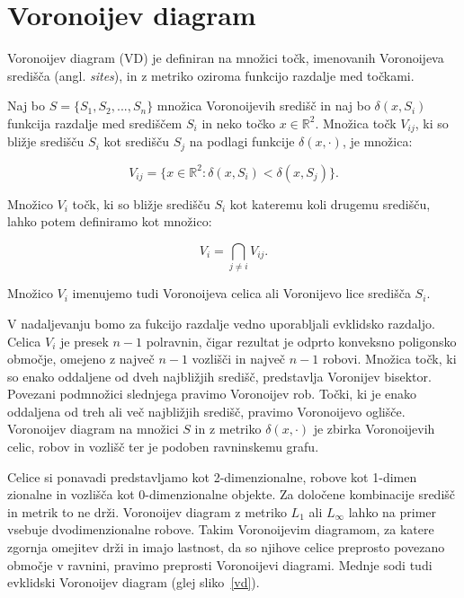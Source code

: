 \documentclass[a4paper, 12pt]{book}
\begin{document}
\section{Voronoijev diagram}
Voronoijev diagram (VD) je definiran na množici točk, imenovanih Voronoijeva središča (angl. \textit{sites}), in z metriko oziroma funkcijo razdalje med točkami.

Naj bo $S = \{S_1,S_2,...,S_n\}$ množica Voronoijevih središč in naj bo $\delta(x,S_i)$ funkcija razdalje med središčem $S_i$ in neko točko $x \in \mathbb{R}^2$. Množica točk $V_{ij}$, ki so bližje središču $S_i$ kot središču $S_j$ na podlagi funkcije $\delta(x,\cdot)$, je množica:

\begin{equation*}
V_{ij} = \{x \in \mathbb{R}^2: \delta(x,S_i) < \delta(x,S_j)\}. 
\end{equation*}

Množico $V_i$ točk, ki so bližje središču $S_i$ kot kateremu koli drugemu središču, lahko potem definiramo kot množico:

\begin{equation*}
V_i = \bigcap_{j \neq i} V_{ij} .
\end{equation*}

Množico $V_i$ imenujemo tudi Voronoijeva celica ali Voronijevo lice središča $S_i$. 

V nadaljevanju bomo za fukcijo razdalje vedno uporabljali evklidsko razdaljo. Celica $V_i$ je presek $n-1$ polravnin, čigar rezultat je odprto konveksno poligonsko območje, omejeno z največ $n-1$ vozlišči in največ $n-1$ robovi. Množica točk, ki so enako oddaljene od dveh najbližjih središč, predstavlja Voronijev bisektor. Povezani podmnožici slednjega pravimo Voronoijev rob. Točki, ki je enako oddaljena od treh ali več najbližjih središč, pravimo Voronoijevo oglišče. Voronoijev diagram na množici $S$ in z metriko $\delta(x,\cdot)$ je zbirka Voronoijevih celic, robov in vozlišč ter je podoben ravninskemu grafu.

Celice si ponavadi predstavljamo kot 2-dimenzionalne, robove kot 1-dim\-en\- zionalne in vozlišča kot 0-dimenzionalne objekte. Za določene kombinacije središč in metrik to ne drži. Voronoijev diagram z metriko $L_1$ ali $L_{\infty}$ lahko na primer vsebuje dvodimenzionalne robove. Takim Voronoijevim diagramom, za katere zgornja omejitev drži in imajo lastnost, da so njihove celice preprosto povezano območje v ravnini, pravimo preprosti Voronoijevi diagrami. Mednje sodi tudi evklidski Voronoijev diagram (glej sliko~\ref{vd}).
\end{document}
